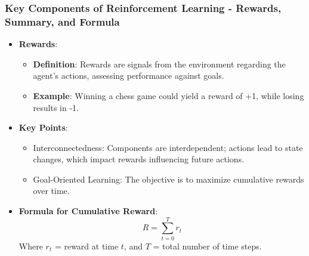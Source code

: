 \documentclass[aspectratio=169]{beamer}
\begin{document}
\begin{frame}[fragile]
  \frametitle{Key Components of Reinforcement Learning - Rewards, Summary, and Formula}
  \begin{itemize}
    \item \textbf{Rewards}:
    \begin{itemize}
      \item \textbf{Definition}: Rewards are signals from the environment regarding the agent's actions, assessing performance against goals.
      \item \textbf{Example}: Winning a chess game could yield a reward of +1, while losing results in -1.
    \end{itemize}
    
    \item \textbf{Key Points}:
    \begin{itemize}
      \item Interconnectedness: Components are interdependent; actions lead to state changes, which impact rewards influencing future actions.
      \item Goal-Oriented Learning: The objective is to maximize cumulative rewards over time.
    \end{itemize}
    
    \item \textbf{Formula for Cumulative Reward}:
    \begin{equation}
      R = \sum_{t=0}^{T} r_t
    \end{equation}
    Where \( r_t \) = reward at time \( t \), and \( T \) = total number of time steps.
  \end{itemize}
\end{frame}
\end{document}
